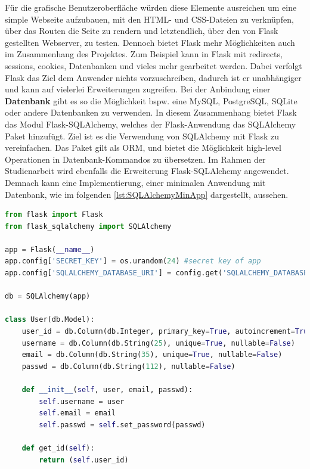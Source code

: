 \documentclass[a4paper,titlepage,halfparskip,12pt]{scrreprt}
\begin{document}
\begin{onehalfspacing}
Für die grafische Benutzeroberfläche würden diese Elemente ausreichen um eine simple Webseite aufzubauen, mit den \ac{HTML}- und \ac{CSS}-Dateien zu verknüpfen, über das Routen die Seite zu rendern und letztendlich, über den von Flask gestellten Webserver, zu testen. Dennoch bietet Flask mehr Möglichkeiten auch im Zusammenhang des Projektes. Zum Beispiel kann in Flask mit redirects, sessions, cookies, Datenbanken und vieles mehr gearbeitet werden. Dabei verfolgt Flask das Ziel dem Anwender nichts vorzuschreiben, dadurch ist er unabhängiger und kann auf vielerlei Erweiterungen zugreifen. Bei der Anbindung einer \textbf{Datenbank} gibt es so die Möglichkeit bspw. eine MySQL, PostgreSQL, SQLite oder andere Datenbanken zu verwenden. In diesem Zusammenhang bietet Flask das Modul Flask-SQLAlchemy, welches der Flask-Anwendung das SQLAlchemy Paket hinzufügt. Ziel ist es die Verwendung von SQLAlchemy mit Flask zu vereinfachen. Das Paket gilt als \ac{ORM}, und bietet die Möglichkeit high-level Operationen in Datenbank-Kommandos zu übersetzen. Im Rahmen der Studienarbeit wird ebenfalls die Erweiterung Flask-SQLAlchemy angewendet. Demnach kann eine Implementierung, einer minimalen Anwendung mit Datenbank, wie im folgenden \autoref{lst:SQLAlchemyMinApp} dargestellt, aussehen.
\begin{lstlisting}[language=Python,caption=Example Listing of Flask-SQLAlchemy,label={lst:SQLAlchemyMinApp}]
from flask import Flask
from flask_sqlalchemy import SQLAlchemy

app = Flask(__name__)
app.config['SECRET_KEY'] = os.urandom(24) #secret key of app
app.config['SQLALCHEMY_DATABASE_URI'] = config.get('SQLALCHEMY_DATABASE_URI')

db = SQLAlchemy(app)

class User(db.Model):
	user_id = db.Column(db.Integer, primary_key=True, autoincrement=True)
	username = db.Column(db.String(25), unique=True, nullable=False)
	email = db.Column(db.String(35), unique=True, nullable=False)
	passwd = db.Column(db.String(112), nullable=False)
	
	def __init__(self, user, email, passwd):
		self.username = user
		self.email = email
		self.passwd = self.set_password(passwd)
	
	def get_id(self):
		return (self.user_id)


\end{lstlisting}
\end{onehalfspacing}
\end{document}
